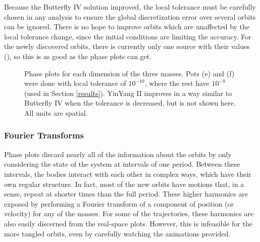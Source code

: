 \documentclass[12pt]{article}
\begin{document}
Because the Butterfly IV solution improved, the local tolerance must be carefully chosen in any analysis to ensure the global discretization error over several orbits can be ignored. There is no hope to improve orbits which are unaffected by the local tolerance change, since the initial conditions are limiting the accuracy. For the newly discovered orbits, there is currently only one source with their values (\cite{suv}), so this is as good as the phase plots can get.
\begin{figure}
 \qquad
{} \qquad
{} \qquad
{} \qquad
{} \qquad
{} \qquad
\caption{Phase plots for each dimension of the three masses. Pots (e) and (f) were done with local tolerance of $10^{-10}$, where the rest have $10^{-8}$ (used in Section \ref{results}). YinYang II improves in a way similar to Butterfly IV when the tolerance is decreased, but is not shown here. All units are spatial.}
\label{f7}
\end{figure}
\subsubsection{Fourier Transforms}
Phase plots discard nearly all of the information about the orbits by only considering the state of the system at intervals of one period. Between these intervals, the bodies interact with each other in complex ways, which have their own regular structure. In fact, most of the new orbits have motions that, in a sense, repeat at shorter times than the full period. These higher harmonics are exposed by performing a Fourier transform of a component of position (or velocity) for any of the masses. For some of the trajectories, these harmonics are also easily discerned from the real-space plots. However, this is infeasible for the more tangled orbits, even by carefully watching the animations provided. \\
\end{document}
